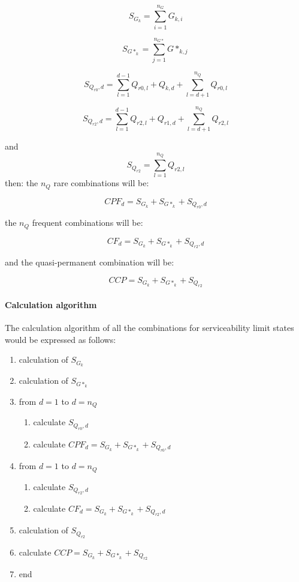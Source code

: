 \begin{equation}
S_{G_k}= \sum_{i=1}^{n_G} G_{k,i}
\end{equation}

\begin{equation}
S_{G*_k}= \sum_{j=1}^{n_{G*}} G*_{k,j}
\end{equation}

\begin{equation}
S_{Q_{r0},d}= \sum_{l=1}^{d-1} Q_{r0,l}+Q_{k,d}+\sum_{l=d+1}^{n_Q} Q_{r0,l}
\end{equation}

\begin{equation}
S_{Q_{r2},d}= \sum_{l=1}^{d-1} Q_{r2,l}+Q_{r1,d}+\sum_{l=d+1}^{n_Q} Q_{r2,l}
\end{equation}

\noindent and
\begin{equation}
S_{Q_{r2}}= \sum_{l=1}^{n_Q} Q_{r2,l}
\end{equation}
\noindent then:
\noindent the $n_Q$ rare combinations will be:

\begin{equation}
CPF_{d}= S_{G_k}+S_{G*_k}+S_{Q_{r0},d}
\end{equation}

\noindent the $n_Q$ frequent combinations will be:

\begin{equation}
CF_{d}= S_{G_k}+S_{G*_k}+S_{Q_{r2},d}
\end{equation}

\noindent and the quasi-permanent combination will be:

\begin{equation}
CCP= S_{G_k}+S_{G*_k}+S_{Q_{r2}}
\end{equation}

\paragraph{Calculation algorithm}
The calculation algorithm of all the combinations for serviceability limit states would be expressed as follows:

\begin{enumerate}
\item calculation of $S_{G_k}$
\item calculation of $S_{G*_k}$
\item from $d=1$ to $d=n_Q$
  \begin{enumerate}
  \item calculate $S_{Q_{r0},d}$
  \item calculate $CPF_d= S_{G_k}+S_{G*_k}+S_{Q_{r0},d}$
  \end{enumerate}
\item from $d=1$ to $d=n_Q$
  \begin{enumerate}
  \item calculate $S_{Q_{r2},d}$
  \item calculate $CF_d= S_{G_k}+S_{G*_k}+S_{Q_{r2},d}$
  \end{enumerate}
\item calculation of $S_{Q_{r2}}$
\item calculate $CCP= S_{G_k}+S_{G*_k}+S_{Q_{r2}}$
\item end
\end{enumerate}
